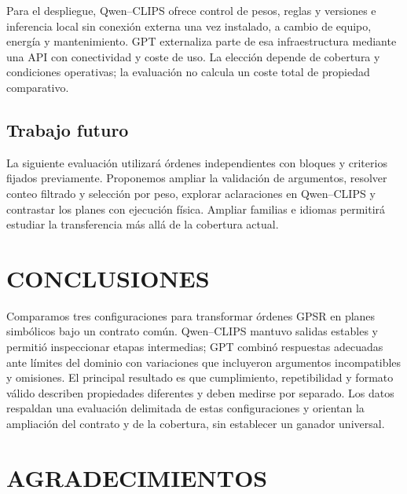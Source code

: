 \documentclass[a4paper,twoside]{article}
\begin{document}
Para el despliegue, Qwen--CLIPS ofrece control de pesos, reglas y versiones e inferencia local sin conexión externa una vez instalado, a cambio de equipo, energía y mantenimiento. GPT externaliza parte de esa infraestructura mediante una API con conectividad y coste de uso. La elección depende de cobertura y condiciones operativas; la evaluación no calcula un coste total de propiedad comparativo.

\subsection{Trabajo futuro}
La siguiente evaluación utilizará órdenes independientes con bloques y criterios fijados previamente. Proponemos ampliar la validación de argumentos, resolver conteo filtrado y selección por peso, explorar aclaraciones en Qwen--CLIPS y contrastar los planes con ejecución física. Ampliar familias e idiomas permitirá estudiar la transferencia más allá de la cobertura actual.

\section{CONCLUSIONES}
Comparamos tres configuraciones para transformar órdenes GPSR en planes simbólicos bajo un contrato común. Qwen--CLIPS mantuvo salidas estables y permitió inspeccionar etapas intermedias; GPT combinó respuestas adecuadas ante límites del dominio con variaciones que incluyeron argumentos incompatibles y omisiones. El principal resultado es que cumplimiento, repetibilidad y formato válido describen propiedades diferentes y deben medirse por separado. Los datos respaldan una evaluación delimitada de estas configuraciones y orientan la ampliación del contrato y de la cobertura, sin establecer un ganador universal.



\section*{AGRADECIMIENTOS}


\end{document}
